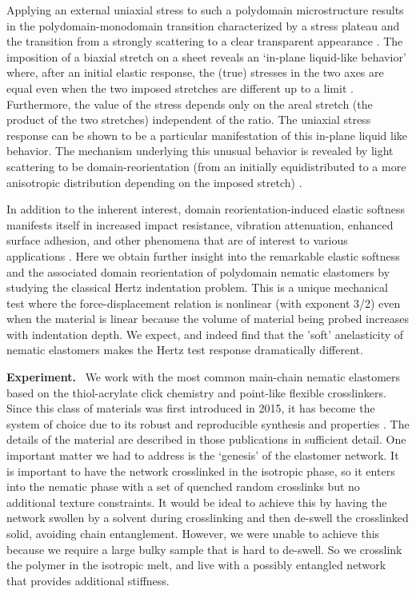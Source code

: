 \documentclass[12pt]{article}
\begin{document}
Applying an external uniaxial stress to such a polydomain microstructure results in the polydomain-monodomain transition characterized by a stress plateau and the transition from a strongly scattering to a clear transparent appearance \cite{Clarke1998,Fridrikh1999,urayama_2009,Biggins2009,Biggins2012}. 
The imposition of a biaxial stretch on a sheet reveals an `in-plane liquid-like behavior' where, after an initial elastic response, the (true) stresses in the two axes are equal even when the two imposed stretches are different up to a limit \cite{tokumoto_2021}.  Furthermore, the value of the stress depends only on the areal stretch (the product of the two stretches) independent of the ratio.  The uniaxial stress response can be shown to be a particular manifestation of this in-plane liquid like behavior. The mechanism underlying this unusual behavior is revealed by light scattering to be domain-reorientation (from an initially equidistributed to a more anisotropic distribution depending on the imposed stretch) \cite{tokumoto_2021}. 

In addition to the inherent interest, domain reorientation-induced elastic softness manifests itself in increased impact resistance, vibration attenuation, enhanced surface adhesion, and other phenomena that are of interest to various applications \cite{saed_2021,Hiro2021}. 
Here we obtain further insight into the remarkable elastic softness and the associated domain reorientation of polydomain nematic elastomers by studying the classical Hertz indentation problem.  This is a unique mechanical test where the force-displacement relation is nonlinear (with exponent 3/2) even when the material is linear because the volume of material being probed increases with indentation depth. We expect, and indeed find that the 'soft' anelasticity of nematic elastomers makes the Hertz test response dramatically different.

\vspace{0.15cm}
\noindent \textbf{Experiment.} \ We work with the most common main-chain nematic elastomers based on the thiol-acrylate click chemistry and point-like flexible crosslinkers. Since this class of materials was first introduced in 2015, it has become the system of choice due to its robust and reproducible synthesis and properties \cite{Mohand2015, Mohand2017}. The details of the material are described in those publications in sufficient detail. One important matter we had to address is the `genesis' of the elastomer network.
It is important to have the network crosslinked in the isotropic phase, so it enters into the nematic phase with a set of quenched random crosslinks but no additional texture constraints. It would be ideal to achieve this by having the network swollen by a solvent during crosslinking and then de-swell the crosslinked solid, avoiding chain entanglement. However, we were unable to achieve this because we require a large bulky sample that is hard to de-swell.  So we crosslink the polymer in the isotropic melt, and live with a possibly entangled network that provides additional stiffness.
\end{document}
